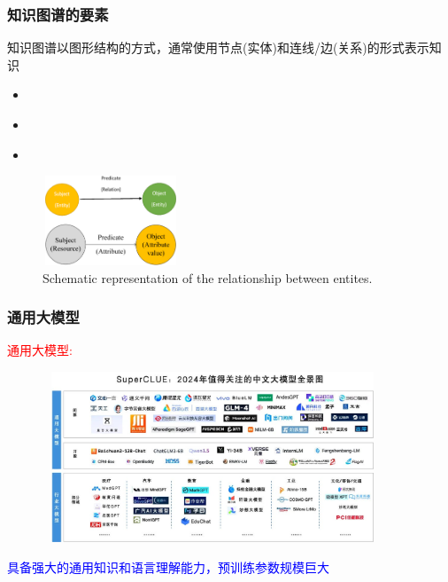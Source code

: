 \frame
{
	\frametitle{知识图谱的要素}
知识图谱以图形结构的方式，通常使用节点(实体)和连线/边(关系)的形式表示知识
%
\begin{itemize}
	\item {\fontsize{7.2pt}{5.2pt}}\\
		{\fontsize{6.2pt}{5.2pt}\selectfont{例如，在化学知识图谱中，分子、合成体、密度等都是实体}}
	\item {\fontsize{7.2pt}{5.2pt}}\\
		{\fontsize{6.2pt}{5.2pt}\selectfont{关系可以是有向的或无向的，如” 具有”、” 属于”、”值为” 等}}
	\item {\fontsize{7.2pt}{5.2pt}}\\
		{\fontsize{6.2pt}{5.2pt}\selectfont{例如，分子(实体)的属性，包括分子量、化合价、密度等}}
\end{itemize}
\begin{figure}[h!]
\centering
\vskip -8pt
\includegraphics[height=1.05in,width=1.60in,viewport=0 0 690 470,clip]{Figures/KG-Entity-relation_0.png}
\caption{\tiny\textrm{Schematic representation of the relationship between entites.}}%
\label{Fig:KG-Entity-relations}
\end{figure}
}
\begin{frame}
    \frametitle{通用大模型}
    \textcolor{red}{通用大模型:}~{\fontsize{8.2pt}{6.2pt}}
\begin{figure}[h!]
\vspace*{-0.05in}
\centering
\includegraphics[height=2.0in, width=4.0in, viewport=0 0 1080 510,clip]{Figures/LLM_model-logo_Chinese.jpg}
\label{LLM_model-logo_Chinese}
\end{figure}
\textcolor{blue}{具备强大的通用知识和语言理解能力，预训练参数规模巨大}
\end{frame}

